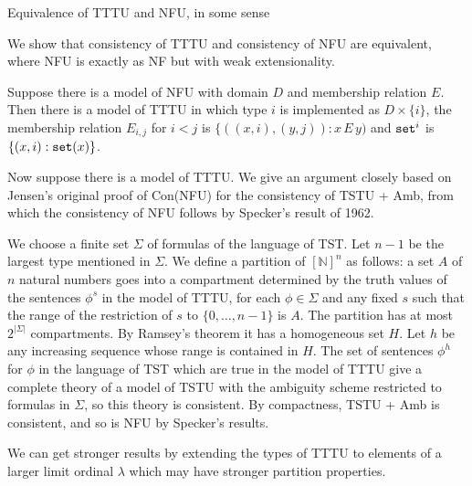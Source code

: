 \documentclass{slides}
\begin{document}
\begin{slide}

{\Large Equivalence of TTTU and NFU, in some sense}

We show that consistency of TTTU and consistency of NFU are equivalent, where NFU is exactly as NF but with weak extensionality.

Suppose there is a model of NFU with domain $D$ and membership relation $E$.  Then there is a model of TTTU in which type $i$ is implemented as $D \times \{i\}$, the membership relation $E_{i,j}$ for $i<j$ is $\{((x,i),(y,j)):x \,E\,y)$ and ${\tt set}^i$ is $\{(x,i):{\tt set}(x)\}$.

Now suppose there is a model of TTTU.  We give an argument closely based on Jensen's original proof of Con(NFU) for the consistency of TSTU + Amb, from which the consistency of NFU follows by Specker's result of 1962.

We choose a finite set $\Sigma$ of formulas of the language of TST.  Let $n-1$ be the largest type mentioned in $\Sigma$.
We define a partition of $[\mathbb N]^n$ as follows:  a set $A$ of $n$ natural numbers goes into a compartment determined by the truth values of the sentences $\phi^s$ in the model of TTTU, for each $\phi \in \Sigma$ and any fixed $s$ such that the range of the restriction of $s$ to $\{0,\ldots,n-1\}$ is $A$.  The partition has at most $2^{|\Sigma|}$ compartments.  By Ramsey's theorem it has a homogeneous set $H$.  Let $h$ be any increasing sequence whose range is contained in $H$.
The set of sentences $\phi^h$ for $\phi$ in the language of TST which are true in the model of TTTU give a complete theory of a model of TSTU with the ambiguity scheme restricted to formulas in $\Sigma$, so this theory is consistent.  By compactness, TSTU + Amb is consistent, and so is NFU by Specker's results.

We can get stronger results by extending the types of TTTU to elements of a larger limit ordinal $\lambda$ which may have stronger partition properties.

\end{slide}
\end{document}
